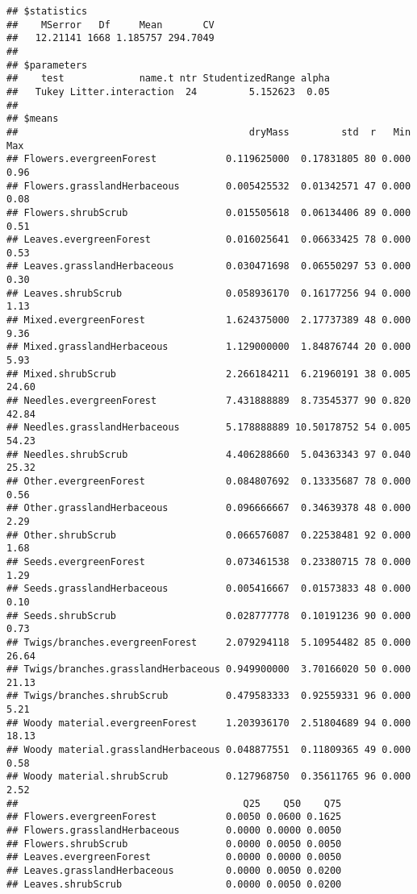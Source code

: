 \documentclass[
]{article}
\begin{document}
\begin{verbatim}
## $statistics
##    MSerror   Df     Mean       CV
##   12.21141 1668 1.185757 294.7049
## 
## $parameters
##    test             name.t ntr StudentizedRange alpha
##   Tukey Litter.interaction  24         5.152623  0.05
## 
## $means
##                                        dryMass         std  r   Min   Max
## Flowers.evergreenForest            0.119625000  0.17831805 80 0.000  0.96
## Flowers.grasslandHerbaceous        0.005425532  0.01342571 47 0.000  0.08
## Flowers.shrubScrub                 0.015505618  0.06134406 89 0.000  0.51
## Leaves.evergreenForest             0.016025641  0.06633425 78 0.000  0.53
## Leaves.grasslandHerbaceous         0.030471698  0.06550297 53 0.000  0.30
## Leaves.shrubScrub                  0.058936170  0.16177256 94 0.000  1.13
## Mixed.evergreenForest              1.624375000  2.17737389 48 0.000  9.36
## Mixed.grasslandHerbaceous          1.129000000  1.84876744 20 0.000  5.93
## Mixed.shrubScrub                   2.266184211  6.21960191 38 0.005 24.60
## Needles.evergreenForest            7.431888889  8.73545377 90 0.820 42.84
## Needles.grasslandHerbaceous        5.178888889 10.50178752 54 0.005 54.23
## Needles.shrubScrub                 4.406288660  5.04363343 97 0.040 25.32
## Other.evergreenForest              0.084807692  0.13335687 78 0.000  0.56
## Other.grasslandHerbaceous          0.096666667  0.34639378 48 0.000  2.29
## Other.shrubScrub                   0.066576087  0.22538481 92 0.000  1.68
## Seeds.evergreenForest              0.073461538  0.23380715 78 0.000  1.29
## Seeds.grasslandHerbaceous          0.005416667  0.01573833 48 0.000  0.10
## Seeds.shrubScrub                   0.028777778  0.10191236 90 0.000  0.73
## Twigs/branches.evergreenForest     2.079294118  5.10954482 85 0.000 26.64
## Twigs/branches.grasslandHerbaceous 0.949900000  3.70166020 50 0.000 21.13
## Twigs/branches.shrubScrub          0.479583333  0.92559331 96 0.000  5.21
## Woody material.evergreenForest     1.203936170  2.51804689 94 0.000 18.13
## Woody material.grasslandHerbaceous 0.048877551  0.11809365 49 0.000  0.58
## Woody material.shrubScrub          0.127968750  0.35611765 96 0.000  2.52
##                                       Q25    Q50    Q75
## Flowers.evergreenForest            0.0050 0.0600 0.1625
## Flowers.grasslandHerbaceous        0.0000 0.0000 0.0050
## Flowers.shrubScrub                 0.0000 0.0050 0.0050
## Leaves.evergreenForest             0.0000 0.0000 0.0050
## Leaves.grasslandHerbaceous         0.0000 0.0050 0.0200
## Leaves.shrubScrub                  0.0000 0.0050 0.0200

\end{verbatim}
\end{document}
